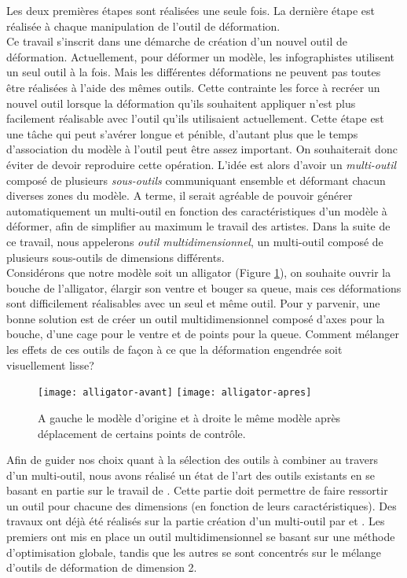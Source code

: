 Les deux premières étapes sont réalisées une seule fois. La dernière étape est
réalisée à chaque manipulation de l'outil de déformation. \\

Ce travail s'inscrit dans une démarche de création d'un nouvel outil de
déformation. Actuellement, pour déformer un modèle, les infographistes
utilisent un seul outil à la fois. Mais les différentes déformations ne
peuvent pas toutes être réalisées à l'aide des mêmes outils. Cette contrainte
les force à recréer un nouvel outil lorsque la déformation qu'ils souhaitent
appliquer n'est plus facilement réalisable avec l'outil qu'ils utilisaient
actuellement. Cette étape est une tâche qui peut s'avérer longue et pénible,
d'autant plus que le temps d'association du modèle à l'outil peut être assez
important. On souhaiterait donc éviter de devoir reproduire cette opération.
L'idée est alors d'avoir un \textit {multi-outil} composé de plusieurs \textit
{sous-outils} communiquant ensemble et déformant chacun diverses zones du
modèle. A terme, il serait agréable de pouvoir générer automatiquement un
multi-outil en fonction des caractéristiques d'un modèle à déformer, afin de
simplifier au maximum le travail des artistes. Dans la suite de ce travail,
nous appelerons \textit{outil multidimensionnel}, un multi-outil composé de
plusieurs sous-outils de dimensions différents. \\

Considérons que notre modèle soit un alligator (Figure \ref{INTall}), on
souhaite ouvrir la bouche de l'alligator, élargir son ventre et bouger sa
queue, mais ces déformations sont difficilement réalisables avec un seul et
même outil. Pour y parvenir, une bonne solution est de créer un outil
multidimensionnel composé d'axes pour la bouche, d'une cage pour le ventre et
de points pour la queue. Comment mélanger les effets de ces outils de
façon à ce que la déformation engendrée soit visuellement lisse? \\

\begin{figure}[ht]
  \texttt{[image: alligator-avant]}
  \texttt{[image: alligator-apres]}

  \caption[Explication déformation multi-outil]   {A gauche le modèle d'origine
et à droite le même modèle après déplacement de certains points de contrôle.}

  \label{INTall}
\end{figure}

Afin de guider nos choix quant à la sélection des outils à combiner au travers
d'un multi-outil, nous avons réalisé un état de l'art des outils existants en
se basant en partie sur le travail de \cite{GB08}. Cette partie doit permettre
de faire ressortir un outil pour chacune des dimensions (en fonction de leurs
caractéristiques). Des travaux ont déjà été réalisés sur la partie création
d'un multi-outil par \cite{JBPS11} et \cite{GPCP13}. Les premiers ont mis en
place un outil multidimensionnel se basant sur une méthode d'optimisation
globale, tandis que les autres se sont concentrés sur le mélange d'outils de
déformation de dimension 2. 

